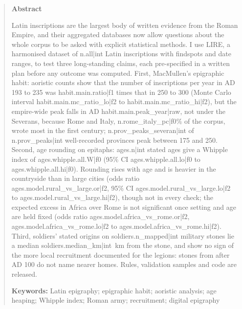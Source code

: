 \begin{quote}
\small
\begin{center}\textbf{Abstract}\end{center}
Latin inscriptions are the largest body of written evidence from the Roman Empire, and their aggregated databases now allow questions about the whole corpus to be asked with explicit statistical methods. I use LIRE, a harmonised dataset of {{n.all|int}} Latin inscriptions with findspots and date ranges, to test three long-standing claims, each pre-specified in a written plan before any outcome was computed. First, MacMullen's epigraphic habit: aoristic counts show that the number of inscriptions per year in AD 193 to 235 was {{habit.main.ratio|f1}} times that in 250 to 300 (Monte Carlo interval {{habit.main.mc_ratio_lo|f2}} to {{habit.main.mc_ratio_hi|f2}}), but the empire-wide peak falls in AD {{habit.main.peak_year|raw}}, not under the Severans, because Rome and Italy, {{n.rome_italy_pc|f0}}\% of the corpus, wrote most in the first century; {{n.prov_peaks_severan|int}} of {{n.prov_peaks|int}} well-recorded provinces peak between 175 and 250. Second, age rounding on epitaphs: {{ages.n|int}} stated ages give a Whipple index of {{ages.whipple.all.W|f0}} (95\% CI {{ages.whipple.all.lo|f0}} to {{ages.whipple.all.hi|f0}}). Rounding rises with age and is heavier in the countryside than in large cities (odds ratio {{ages.model.rural_vs_large.or|f2}}, 95\% CI {{ages.model.rural_vs_large.lo|f2}} to {{ages.model.rural_vs_large.hi|f2}}), though not in every check; the expected excess in Africa over Rome is not significant once setting and age are held fixed (odds ratio {{ages.model.africa_vs_rome.or|f2}}, {{ages.model.africa_vs_rome.lo|f2}} to {{ages.model.africa_vs_rome.hi|f2}}). Third, soldiers' stated origins on {{soldiers.n_mapped|int}} military stones lie a median {{soldiers.median_km|int}}~km from the stone, and show no sign of the more local recruitment documented for the legions: stones from after AD 100 do not name nearer homes. Rules, validation samples and code are released.

\textbf{Keywords:} Latin epigraphy; epigraphic habit; aoristic analysis; age heaping; Whipple index; Roman army; recruitment; digital epigraphy
\end{quote}

